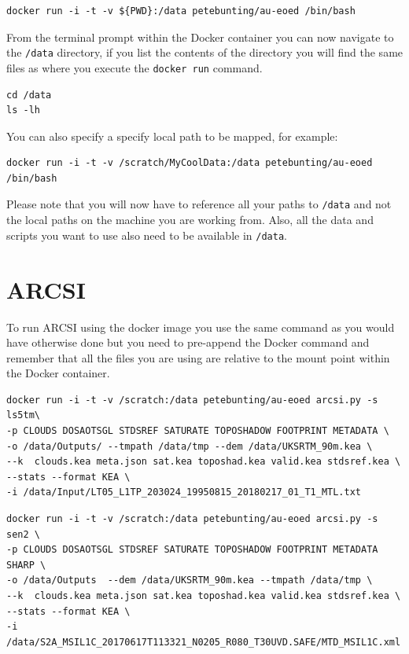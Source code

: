 \documentclass[authoryear, 11pt, oneside]{report}
\begin{document}
\begin{verbatim}
docker run -i -t -v ${PWD}:/data petebunting/au-eoed /bin/bash
\end{verbatim}

From the terminal prompt within the Docker container you can now navigate to the \texttt{/data} directory, if you list the contents of the directory you will find the same files as where you execute the \texttt{docker run} command.

\begin{verbatim}
cd /data
ls -lh
\end{verbatim}

You can also specify a specify local path to be mapped, for example:

\begin{verbatim}
docker run -i -t -v /scratch/MyCoolData:/data petebunting/au-eoed /bin/bash
\end{verbatim}

Please note that you will now have to reference all your paths to \texttt{/data} and not the local paths on the machine you are working from. Also, all the data and scripts you want to use also need to be available in \texttt{/data}.

\section{ARCSI}

To run ARCSI using the docker image you use the same command as you would have otherwise done but you need to pre-append the Docker command and remember that all the files you are using are relative to the mount point within the Docker container.

\begin{verbatim}
docker run -i -t -v /scratch:/data petebunting/au-eoed arcsi.py -s ls5tm\
-p CLOUDS DOSAOTSGL STDSREF SATURATE TOPOSHADOW FOOTPRINT METADATA \
-o /data/Outputs/ --tmpath /data/tmp --dem /data/UKSRTM_90m.kea \
--k  clouds.kea meta.json sat.kea toposhad.kea valid.kea stdsref.kea \
--stats --format KEA \
-i /data/Input/LT05_L1TP_203024_19950815_20180217_01_T1_MTL.txt
\end{verbatim}

\begin{verbatim}
docker run -i -t -v /scratch:/data petebunting/au-eoed arcsi.py -s sen2 \
-p CLOUDS DOSAOTSGL STDSREF SATURATE TOPOSHADOW FOOTPRINT METADATA SHARP \
-o /data/Outputs  --dem /data/UKSRTM_90m.kea --tmpath /data/tmp \
--k  clouds.kea meta.json sat.kea toposhad.kea valid.kea stdsref.kea \
--stats --format KEA \
-i /data/S2A_MSIL1C_20170617T113321_N0205_R080_T30UVD.SAFE/MTD_MSIL1C.xml
\end{verbatim}
\end{document}
